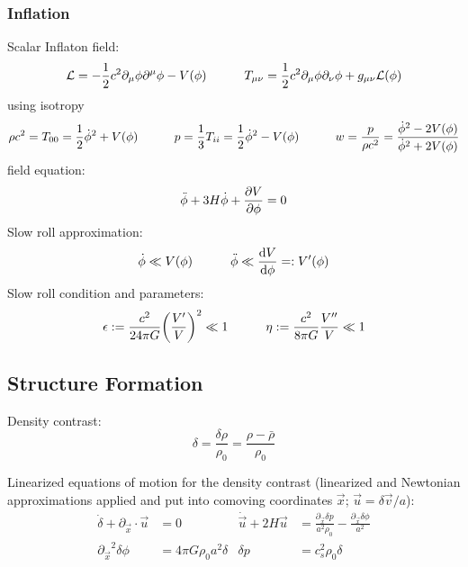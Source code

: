 		\subsubsection{Inflation}
			Scalar Inflaton field:
			\begin{equation}
				\mathcal{L} = -\frac{1}{2}c^2 \partial_\mu \phi \partial^\mu \phi - V(\phi)
				\hspace{30pt}
				T_{\mu\nu} = \frac{1}{2} c^2 \partial_\mu \phi \partial_\nu \phi + g_{\mu\nu} \mathcal{L}(\phi)
			\end{equation}
			using isotropy
			\begin{equation}
				\rho c^2 = T_{00} = \frac{1}{2} \dot{\phi}^2 + V(\phi)
				\hspace{30pt}
				p = \frac{1}{3} T_{ii} = \frac{1}{2} \dot{\phi}^2 - V(\phi)
				\hspace{30pt}
				w = \frac{p}{\rho c^2} = \frac{\dot{\phi}^2 - 2V(\phi)}{\dot{\phi}^2 + 2V(\phi)}
			\end{equation}
			field equation:
			\begin{equation}
				\ddot{\phi} + 3 H \dot{\phi} + \pdv{V}{\phi} = 0
			\end{equation}
			Slow roll approximation:
			\begin{equation}
				\dot{\phi} \ll V(\phi)
				\hspace{30pt}
				\ddot{\phi} \ll \dv{V}{\phi} =: V'(\phi)
			\end{equation}
			Slow roll condition and parameters:
			\begin{equation}
				\epsilon := \frac{c^2}{24\pi G} \qty(\frac{V'}{V})^2 \ll 1
				\hspace{30pt}
				\eta := \frac{c^2}{8\pi G} \frac{V''}{V} \ll 1
			\end{equation}

	\subsection{Structure Formation}
		Density contrast:
		\begin{equation}
			\delta  = \frac{\delta \rho}{\rho_0} = \frac{ \rho - \bar{\rho}}{\rho_0}
		\end{equation}

		\noindent
		Linearized equations of motion for the density contrast (linearized and Newtonian approximations applied and put into comoving coordinates $\vec{x}$; $\vec{u} = \delta\vec{v}/a$):
		\begin{equation}
			\begin{aligned}
				\dot{\delta} + \partial_{\vec{x}} \cdot \vec{u} &= 0
				&
				\dot{\vec{u}} + 2 H \vec{u} &= \frac{\partial_{\vec{x}} \delta p}{a^2 \rho_0} - \frac{\partial_{\vec{x}} \delta \phi}{a^2} \\
				{\partial_{\vec{x}}}^2 \delta \phi &= 4 \pi G \rho_0 a^2 \delta
				&
				\delta p &= c_s^2 \rho_0 \delta
			\end{aligned}
		\end{equation}

